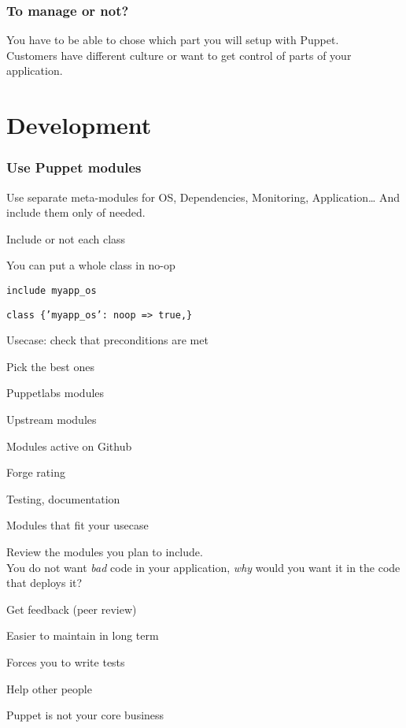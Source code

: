 \begin{frame}
    \frametitle{To manage or not?}
    \huge You have to be able to chose which part you will setup with Puppet.\\\large Customers have different culture or want to get control of parts of your application.
\end{frame}

\section{Development}
\begin{frame}
    \frametitle{Use Puppet modules}
    \huge Use separate meta-modules for OS, Dependencies, Monitoring, Application\dots{} And include them only of needed.
\end{frame}

\begin{iframe}
\item Include or not each class
\item You can put a whole class in no-op
\item {\texttt{include myapp\_os}}
\item {\texttt{class \{'myapp\_os': noop => true,\}}}
\item {Usecase: check that preconditions are met}
\end{iframe}


\begin{iframe}
\item Pick the best ones
\item Puppetlabs modules
\item Upstream modules
\item Modules active on Github
\item Forge rating
\item Testing, documentation
\item Modules that fit your usecase
\end{iframe}

\begin{frame}\LARGE Review the modules you plan to include.\pause\\You do not want \textit{bad} code in your application, \textit{why} would you want it in the code that deploys it?\end{frame}

\begin{iframe}
\item Get feedback (peer review)
\item Easier to maintain in long term
\item Forces you to write tests
\item Help other people
\item Puppet is not your core business
\end{iframe}


